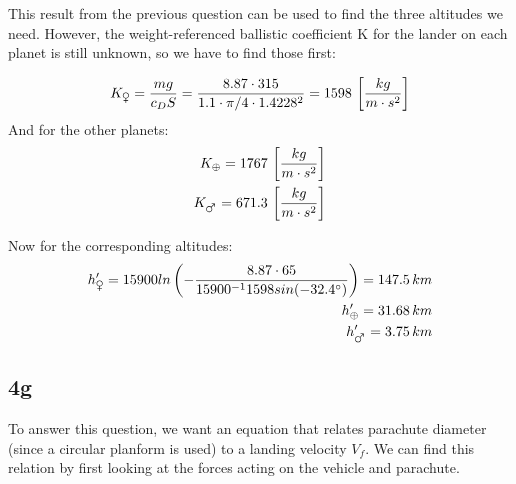 This result from the previous question can be used to find the three altitudes we need. However, the weight-referenced ballistic coefficient K for the lander on each planet is still unknown, so we have to find those first:

\begin{equation}
    K_{\venus} = \frac{mg}{c_D S} = \frac{8.87 \cdot 315}{1.1 \cdot \pi/4 \cdot 1.4228^2} = 1598 \, \left[ \frac{kg}{m \cdot s^2} \right]
\end{equation}
And for the other planets:
\begin{equation}
\begin{split}
    K_{\oplus} = 1767\, \left[ \frac{kg}{m \cdot s^2} \right] \\
    K_{\mars} =  671.3 \, \left[ \frac{kg}{m \cdot s^2} \right] \\
\end{split}
\end{equation}

Now for the corresponding altitudes:
\begin{equation}
\begin{split}
    h'_{\venus} = 15900 ln \left( -\frac{8.87 \cdot 65}{15900^{-1} 1598 sin(-32.4^{\circ})} \right) = 147.5 \, km\\
    h'_{\oplus} = 31.68 \, km\\
    h'_{\mars} = 3.75 \, km\\
\end{split}
\end{equation}

\subsection{4g}
To answer this question, we want an equation that relates parachute diameter (since a circular planform is used) to a landing velocity $V_f$. We can find this relation by first looking at the forces acting on the vehicle and parachute.


